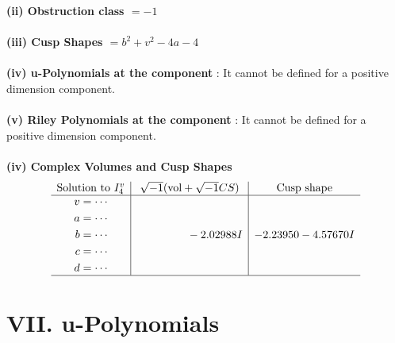 \documentclass[1p]{elsarticle_modified}
\theoremstyle{definition}
\newcommand{\I}{\sqrt{-1}}
\begin{document}
\flushleft \textbf{(ii) Obstruction class $= -1$}\\~\\
\flushleft \textbf{(iii) Cusp Shapes $= b^2+v^2-4 a-4$}\\~\\
\flushleft \textbf{(iv) u-Polynomials at the component} : It cannot be defined for a positive dimension component.\\~\\
\flushleft \textbf{(v) Riley Polynomials at the component} : It cannot be defined for a positive dimension component.\\~\\
\newpage\flushleft \textbf{(iv) Complex Volumes and Cusp Shapes}
$$\begin{array}{c|c|c} 
\text{Solution to }I^v_{4}& \I (\text{vol} + \sqrt{-1}CS) & \text{Cusp shape}\\
 \hline 
\begin{aligned}
v &= \cdots \\
a &= \cdots \\
b &= \cdots \\
c &= \cdots \\
d &= \cdots\end{aligned}
 & \phantom{-0.000000 } -2.02988 I & -2.23950 - 4.57670 I\\
 \hline 
 \end{array}
$$
\newpage\renewcommand{\arraystretch}{1}
\centering \section*{ VII. u-Polynomials}
\end{document}
